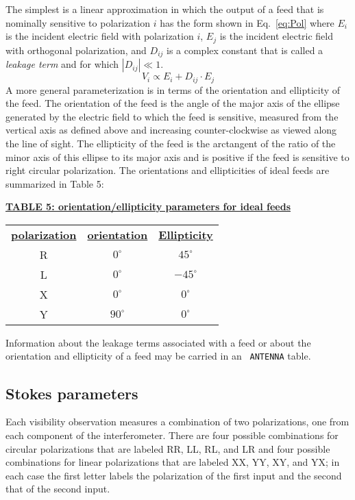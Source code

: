 \documentclass[twoside]{article}
\newcommand{\Hi}[1]{\textcolor{hicol}{#1}}
\begin{document}
The simplest is a linear approximation in which the output of a feed
that is nominally sensitive to polarization $i$  has the form shown in
Eq.~\ref{eq:Pol} where $E_i$ is the incident electric field with
polarization $i$, $E_j$ is the incident electric field with
orthogonal polarization, and $D_{ij}$ is a complex constant that is
called a {\it leakage term} and for which $| D_{ij} | \ll 1$.
\begin{equation}
 V_i \propto E_i + D_{ij} \cdot  E_j   \label{eq:Pol}
\end{equation}
A more general parameterization is in terms of the orientation and
ellipticity of the feed.  The orientation of the feed is the angle of
the major axis of the ellipse generated by the electric field to which
the feed is sensitive, measured from the vertical axis as defined
above and increasing counter-clockwise as viewed along the line of
sight.  The ellipticity of the feed is the arctangent of the ratio of
the minor axis of this ellipse to its major axis and is positive if the
feed is sensitive to right circular polarization.  The orientations
and ellipticities of ideal feeds are summarized in Table 5:

\begin{center}
\underline{\bf{TABLE 5: orientation/ellipticity parameters for ideal
    feeds}}\\
\begin{tabular}{ccc}
\noalign{\vspace{2pt}}
\underline{{\bf polarization}} & \underline{\bf{orientation\vphantom{j}}}  &
       \underline{\bf{Ellipticity}} \\
\noalign{\vspace{2pt}}
 R & $0^\circ$ & $45^\circ$ \\
 L & $0^\circ$ & $-45^\circ$ \\
 X & $0^\circ$ & $0^\circ$  \\
 Y & $90^\circ$ & $0^\circ$
\end{tabular}
\end{center}
Information about the leakage terms associated with a feed or about the
orientation and ellipticity of a feed may be carried in an {\tt
ANTENNA} table.

\subsection{Stokes parameters}
\label{Intr:Stokes}

Each visibility \Hi{observation} measures a combination of two
polarizations, one from each component of the interferometer.  There
are four possible combinations for circular polarizations that are
labeled RR, LL, RL, and LR and four possible combinations for linear
polarizations that are labeled XX, YY, XY, and YX; in each case the
first letter labels the polarization of the first input and the second
that of the second input.
\end{document}
